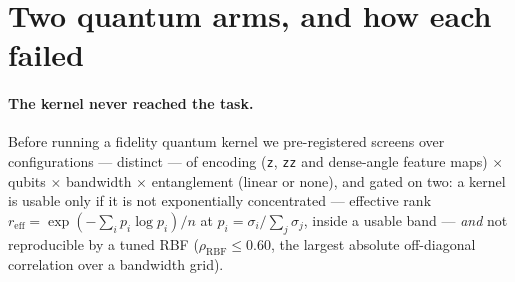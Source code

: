 \section{Two quantum arms, and how each failed}
\label{sec:quantum}

\paragraph{The kernel never reached the task.} Before running a fidelity quantum kernel we
pre-registered screens over \ClaimScreenConfigs{} configurations --- \ClaimScreenDistinctKernels{} distinct --- of encoding
(\texttt{z}, \texttt{zz} and dense-angle feature maps) $\times$ qubits $\times$ bandwidth
$\times$ entanglement (linear or none), and gated on two: a kernel is usable only if it is
not exponentially concentrated --- effective rank
$r_{\mathrm{eff}} = \exp(-\sum_i p_i \log p_i)/n$ at $p_i = \sigma_i/\sum_j \sigma_j$, inside a
usable band --- \emph{and} not reproducible by a tuned RBF ($\rho_{\mathrm{RBF}} \le 0.60$, the
largest absolute off-diagonal correlation over a bandwidth grid).

